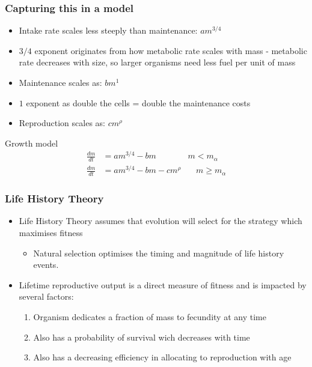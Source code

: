 \documentclass[handout]{beamer}
\begin{document}
\begin{frame}
	\frametitle{Capturing this in a model}
	\begin{itemize}
		\item Intake rate scales less steeply than maintenance: $am^{3/4}$
		\item $3/4$ exponent originates from how metabolic rate scales with mass - metabolic rate decreases with size, so larger organisms need less fuel per unit of mass
		\item Maintenance scales as: $bm^{1}$
		\item $1$ exponent as double the cells = double the maintenance costs
		\item Reproduction scales as: $cm^{\rho}$
	\end{itemize}

	\begin{block}{Growth model}
		\begin{align*}
			\frac{dm}{dt} &= am^{3/4} - bm \ \ \ \ \ \ \ \ \ \ \ \ \ \ \ \ \ m < m_{\alpha}\\
			\frac{dm}{dt} &= am^{3/4} - bm - cm^{\rho} \ \ \ \ \  \ \ \ m \geq m_{\alpha}
		\end{align*}
	\end{block}
\end{frame}

\begin{frame}
	\frametitle{Life History Theory}
	\begin{itemize}
		\item Life History Theory assumes that evolution will select for the strategy which maximises fitness
		\begin{itemize}
			\item Natural selection optimises the timing and magnitude of life history events.
		\end{itemize}
		\item Lifetime reproductive output is a direct measure of fitness and is impacted by several factors:
		\begin{enumerate}
			\item Organism dedicates a fraction of mass to fecundity at any time 
			\item Also has a probability of survival wich decreases with time
			\item Also has a decreasing efficiency in allocating to reproduction with age
		\end{enumerate}
	\end{itemize}
\end{frame}
\end{document}
